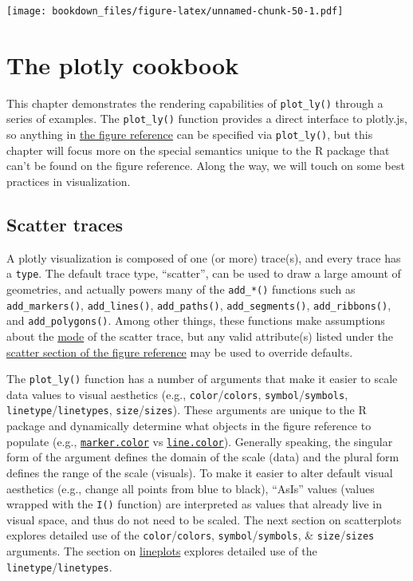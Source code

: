 \documentclass[12pt,]{isuthesis}
\begin{document}
\texttt{[image: bookdown\_files/figure-latex/unnamed-chunk-50-1.pdf]}

\section{The plotly cookbook}\label{the-plotly-cookbook}

This chapter demonstrates the rendering capabilities of
\texttt{plot\_ly()} through a series of examples. The
\texttt{plot\_ly()} function provides a direct interface to plotly.js,
so anything in \href{https://plot.ly/r/reference/}{the figure reference}
can be specified via \texttt{plot\_ly()}, but this chapter will focus
more on the special semantics unique to the R package that can't be
found on the figure reference. Along the way, we will touch on some best
practices in visualization.

\hypertarget{scatter-traces}{\subsection{Scatter
traces}\label{scatter-traces}}

A plotly visualization is composed of one (or more) trace(s), and every
trace has a \texttt{type}. The default trace type, ``scatter'', can be
used to draw a large amount of geometries, and actually powers many of
the \texttt{add\_*()} functions such as \texttt{add\_markers()},
\texttt{add\_lines()}, \texttt{add\_paths()}, \texttt{add\_segments()},
\texttt{add\_ribbons()}, and \texttt{add\_polygons()}. Among other
things, these functions make assumptions about the
\href{https://plot.ly/r/reference/\#scatter-mode}{mode} of the scatter
trace, but any valid attribute(s) listed under the
\href{https://plot.ly/r/reference/\#scatter}{scatter section of the
figure reference} may be used to override defaults.

The \texttt{plot\_ly()} function has a number of arguments that make it
easier to scale data values to visual aesthetics (e.g.,
\texttt{color}/\texttt{colors}, \texttt{symbol}/\texttt{symbols},
\texttt{linetype}/\texttt{linetypes}, \texttt{size}/\texttt{sizes}).
These arguments are unique to the R package and dynamically determine
what objects in the figure reference to populate (e.g.,
\href{https://plot.ly/r/reference/\#scatter-marker-color}{\texttt{marker.color}}
vs \href{https://plot.ly/r/reference/\#scatter}{\texttt{line.color}}).
Generally speaking, the singular form of the argument defines the domain
of the scale (data) and the plural form defines the range of the scale
(visuals). To make it easier to alter default visual aesthetics (e.g.,
change all points from blue to black), ``AsIs'' values (values wrapped
with the \texttt{I()} function) are interpreted as values that already
live in visual space, and thus do not need to be scaled. The next
section on scatterplots explores detailed use of the
\texttt{color}/\texttt{colors}, \texttt{symbol}/\texttt{symbols}, \&
\texttt{size}/\texttt{sizes} arguments. The section on
\protect\hyperlink{line-plots}{lineplots} explores detailed use of the
\texttt{linetype}/\texttt{linetypes}.
\end{document}
